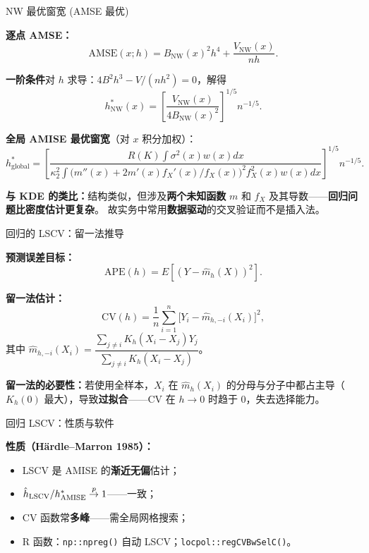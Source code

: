 \documentclass[aspectratio=169, 10pt]{beamer}
\begin{document}
\begin{frame}{NW 最优窗宽 (AMSE 最优)}

  \textbf{逐点 AMSE：}
  \[
    \text{AMSE}(x; h) = B_{\text{NW}}(x)^2 h^4 + \frac{V_{\text{NW}}(x)}{nh}.
  \]

  \textbf{一阶条件}对 $h$ 求导：$4 B^2 h^3 - V/(nh^2) = 0$，解得
  \[
    h^*_{\text{NW}}(x) = \left[\frac{V_{\text{NW}}(x)}{4 B_{\text{NW}}(x)^2}\right]^{1/5} n^{-1/5}.
  \]

  \textbf{全局 AMISE 最优窗宽}（对 $x$ 积分加权）：
  \[
    h^*_{\text{global}} = \left[\frac{R(K)\int \sigma^2(x) w(x) dx}{\kappa_2^2 \int \bigl(m''(x) + 2 m'(x) f_X'(x)/f_X(x)\bigr)^2 f_X^2(x) w(x) dx}\right]^{1/5} n^{-1/5}.
  \]

  \begin{keybox}
    \textbf{与 KDE 的类比：}结构类似，但涉及\textbf{两个未知函数} $m$ 和 $f_X$ 及其导数——\textbf{回归问题比密度估计更复杂}。
    故实务中常用\textbf{数据驱动}的交叉验证而不是插入法。
  \end{keybox}

\end{frame}


\begin{frame}{回归的 LSCV：留一法推导}

  \textbf{预测误差目标：}
  \[
    \text{APE}(h) = E\left[(Y - \hat m_{h}(X))^2\right].
  \]

  \textbf{留一法估计：}
  \[
    \boxed{\;\text{CV}(h) = \frac{1}{n}\sum_{i=1}^n \bigl[Y_i - \hat m_{h,-i}(X_i)\bigr]^2,\;}
  \]
  其中 $\hat m_{h,-i}(X_i) = \dfrac{\sum_{j\neq i} K_h(X_i - X_j) Y_j}{\sum_{j\neq i} K_h(X_i - X_j)}$。

  \begin{highlightbox}
    \textbf{留一法的必要性：}若使用全样本，$X_i$ 在 $\hat m_h(X_i)$ 的分母与分子中都占主导（$K_h(0)$ 最大），导致\textbf{过拟合}——CV 在 $h\to 0$ 时趋于 0，失去选择能力。
  \end{highlightbox}

\end{frame}


\begin{frame}{回归 LSCV：性质与软件}

  \begin{keybox}
    \textbf{性质（Härdle--Marron 1985）：}
    \begin{itemize}
      \item LSCV 是 AMISE 的\textbf{渐近无偏}估计；
      \item $\hat h_{\text{LSCV}}/h^*_{\text{AMISE}} \overset{p}{\to} 1$——一致；
      \item CV 函数常\textbf{多峰}——需全局网格搜索；
      \item R 函数：\texttt{np::npreg()} 自动 LSCV；\texttt{locpol::regCVBwSelC()}。
    \end{itemize}
  \end{keybox}

\end{frame}
\end{document}

